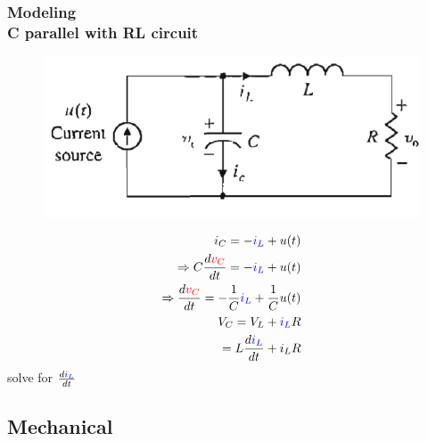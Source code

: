 \documentclass[hyperref={pdfpagelabels=true}]{beamer}
\begin{document}
\begin{frame}
\frametitle{Modeling\\ {\large C parallel with RL circuit}} 
\begin{figure}[!t]
\centering
\includegraphics[scale = 0.25]{figs/Selection_021.png}
\end{figure}
\begin{eqnarray*}
i_C=-\textcolor{blue}{i_L}+u(t) \\
\Rightarrow C\frac{d\textcolor{red}{v_C}}{dt}=-\textcolor{blue}{i_L}+u(t) \\
\Rightarrow \frac{d\textcolor{red}{v_C}}{dt}=-\frac{1}{C}\textcolor{blue}{i_L}+\frac{1}{C}u(t)
\\  \newline \newline
V_C=V_L+\textcolor{blue}{i_L}R 
\\ = L\frac{d\textcolor{blue}{i_L}}{dt}+i_LR
\end{eqnarray*}
solve for $\frac{d\textcolor{blue}{i_L}}{dt}$
\end{frame}



\subsection{Mechanical}
\end{document}
